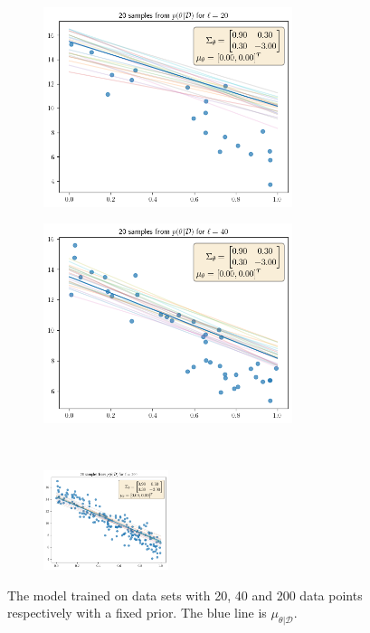 \begin{figure}[H]
\begin{subfigure}{.5\textwidth}
  \centering
  \includegraphics[width=0.8\textwidth]{assets/week1/fixed-prior-20-samples.png}
\end{subfigure}%
\begin{subfigure}{.5\textwidth}
  \centering
  \includegraphics[width=0.8\textwidth]{assets/week1/fixed-prior-40-samples.png}
\end{subfigure}\\
\begin{subfigure}{1\textwidth}
  \centering
  \includegraphics[width=0.4\textwidth]{assets/week1/fixed-prior-200-samples.png}
\end{subfigure}%
\caption{The model trained on data sets with 20, 40 and 200 data points respectively with a fixed prior. The blue line is $\mu_{\theta|\mathcal{D}}$.}
\label{fig:fixed-prior}
\end{figure}


